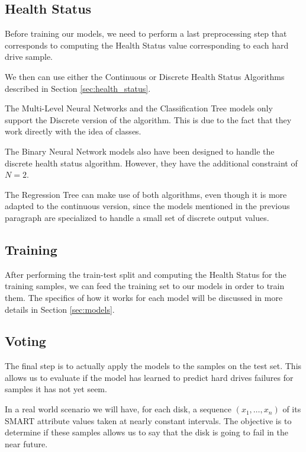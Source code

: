 \subsection{Health Status}\label{subsec:health_status}

Before training our models, we need to perform a last preprocessing step that corresponds to computing the Health Status value corresponding to each hard drive sample.

We then can use either the Continuous or Discrete Health Status Algorithms described in Section \ref{sec:health_status}.

The Multi-Level Neural Networks and the Classification Tree models only support the Discrete version of the algorithm.
This is due to the fact that they work directly with the idea of classes.

The Binary Neural Network models also have been designed to handle the discrete health status algorithm.
However, they have the additional constraint of $N = 2$.

The Regression Tree can make use of both algorithms, even though it is more adapted to the continuous version, since the models mentioned in the previous paragraph are specialized to handle a small set of discrete output values.

\subsection{Training}

After performing the train-test split and computing the Health Status for the training samples, we can feed the training set to our models in order to train them.
The specifics of how it works for each model will be discussed in more details in Section \ref{sec:models}.

\subsection{Voting}\label{subsec:voting}

The final step is to actually apply the models to the samples on the test set.
This allows us to evaluate if the model has learned to predict hard drives failures for samples it has not yet seem.

In a real world scenario we will have, for each disk, a sequence $(x_1,\dots,x_n)$ of its SMART attribute values taken at nearly constant intervals.
The objective is to determine if these samples allows us to say that the disk is going to fail in the near future.

